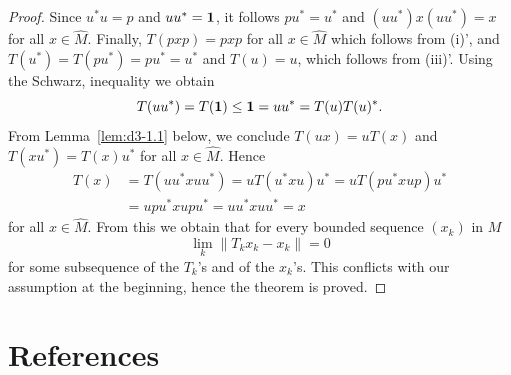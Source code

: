 \begin{proof}
Since $u^{*}u = p$ and $uu^{*} = \mathbf{1}$, it follows $pu^{*} = u^{*}$ and $(uu^{*})x(uu^{*}) = x$ for all $x \in \widehat{M}$.
Finally, $T(pxp) = pxp$ for all $x \in \widehat{M}$ which follows from \upshape(i)', and $T(u^{*}) = T(pu^{*}) = pu^{*} = u^{*}$ and $T(u) = u$, which follows from \upshape(iii)'.
Using the Schwarz, inequality we obtain
\[
	T(uu^{*}) = T(\1) \leq \1 = uu^{*} = T(u)T(u)^{*}.
\]
From Lemma~\ref{lem:d3-1.1} below, we conclude $T(ux) = uT(x)$ and $T(xu^{*}) = T(x)u^{*}$ for all $x \in \widehat{M}$.
Hence
\begin{align*}
T(x) &= T(uu^{*}xuu^{*}) = uT(u^{*}xu)u^{*} = uT(pu^{*}xup)u^{*} \\
&= upu^{*}xupu^{*} = uu^{*}xuu^{*} = x
\end{align*}
for all $x \in \widehat{M}$.
From this we obtain that for every bounded sequence $(x_{k})$ in $M$
\[
	\lim_k \|T_k x_{k} - x_{k}\| = 0
\]
for some subsequence of the $T_{k}$'s and of the $x_{k}$'s.
This conflicts with our assumption at the beginning, hence the theorem is proved.
\end{proof}
\section*{References}
{\RaggedRight
  \printbibliography[heading=none]
 }